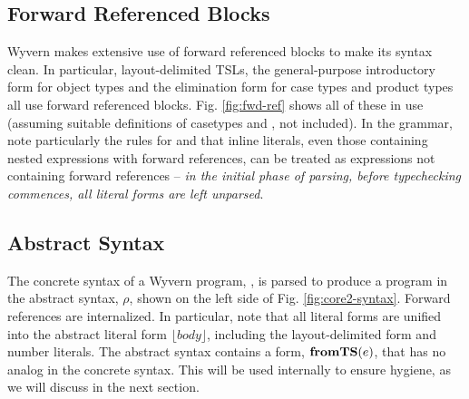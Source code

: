 \subsection{Forward Referenced Blocks}
Wyvern makes extensive use of forward referenced blocks to make its syntax clean. In particular, layout-delimited TSLs, the general-purpose introductory form for object types and the elimination form for case types and product types all use forward referenced blocks. Fig. \ref{fig:fwd-ref} shows all of these in use (assuming suitable definitions of casetypes  and , not included). In the grammar, note particularly the rules for  and that inline literals, even those containing nested expressions with forward references, can be treated as expressions not containing forward references -- \emph{in the initial phase of parsing, before typechecking commences, all literal forms are left unparsed}.

\subsection{Abstract Syntax}
The concrete syntax of a Wyvern program, , is parsed to produce a program in the abstract syntax, $\rho$, shown on the left side of Fig. \ref{fig:core2-syntax}. Forward references are internalized. In particular, note that all literal forms are unified into the abstract literal form $\lfloor body \rfloor$, including the layout-delimited form and number literals. The abstract syntax contains a form, $\textbf{fromTS}(e)$, that has no analog in the concrete syntax. This will be used internally to ensure hygiene, as we will discuss in the next section.

